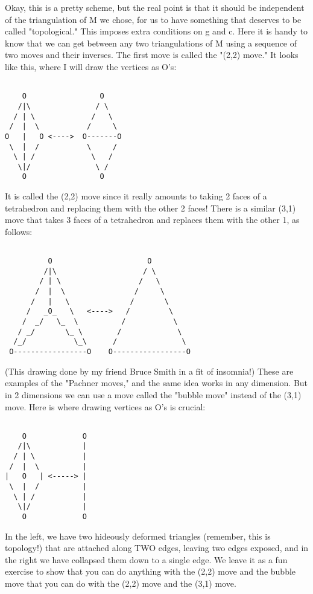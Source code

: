 Okay, this is a pretty scheme, but the real point is that it should be
independent of the triangulation of M we chose, for us to have something
that deserves to be called "topological."  This imposes extra
conditions on g and c.  Here it is handy to know that we can get between
any two triangulations of M using a sequence of two moves and their
inverses.   The first move is called the "(2,2) move." It looks like
this, where I will draw the vertices as O's: 


\begin{verbatim}

    O                 O
   /|\               / \    
  / | \             /   \  
 /  |  \           /     \ 
O   |   O <---->  O-------O
 \  |  /           \     /   
  \ | /             \   /          
   \|/               \ /     
    O                 O
\end{verbatim}
    

It is called the (2,2) move since it really amounts to taking 2 faces
of a tetrahedron and replacing them with the other 2 faces!  There is a
similar (3,1) move that takes 3 faces of a tetrahedron and replaces them
with the other 1, as follows:
 

\begin{verbatim}

          O                      O
         /|\                    / \
        / | \                  /   \
       /  |  \                /     \
      /   |   \              /       \
     /   _O_   \   <---->   /         \
    /  _/   \_  \          /           \
   / _/       \_ \        /             \
  /_/           \_\      /               \
 O-----------------O    O-----------------O
\end{verbatim}
    
 
(This drawing done by my friend Bruce Smith in a fit of insomnia!)
These are examples of the "Pachner moves," and the same idea works in
any dimension.   But in 2 dimensions we can use a move called the "bubble move"
instead of the (3,1) move.  Here is where drawing vertices as O's is crucial:  


\begin{verbatim}

    O             O
   /|\            |
  / | \           |
 /  |  \          |
|   O   | <-----> |
 \  |  /          |
  \ | /           |
   \|/            |
    O             O
\end{verbatim}
    

In the left, we have two hideously deformed triangles (remember, this is
topology!) that are attached along TWO edges, leaving two edges exposed,
and in the right we have collapsed them down to a single edge.  We leave
it as a fun exercise to show that you can do anything with the (2,2)
move and the bubble move that you can do with the (2,2) move and the
(3,1) move.  


